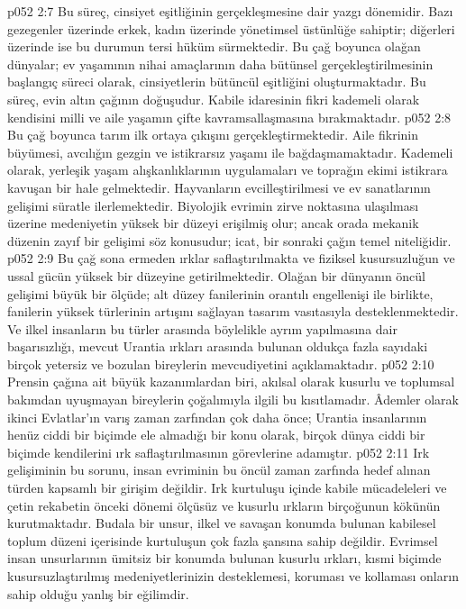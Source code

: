 \vs p052 2:7 Bu süreç, cinsiyet eşitliğinin gerçekleşmesine dair yazgı dönemidir. Bazı gezegenler üzerinde erkek, kadın üzerinde yönetimsel üstünlüğe sahiptir; diğerleri üzerinde ise bu durumun tersi hüküm sürmektedir. Bu çağ boyunca olağan dünyalar; ev yaşamının nihai amaçlarının daha bütünsel gerçekleştirilmesinin başlangıç süreci olarak, cinsiyetlerin bütüncül eşitliğini oluşturmaktadır. Bu süreç, evin altın çağının doğuşudur. Kabile idaresinin fikri kademeli olarak kendisini milli ve aile yaşamın çifte kavramsallaşmasına bırakmaktadır.
\vs p052 2:8 Bu çağ boyunca tarım ilk ortaya çıkışını gerçekleştirmektedir. Aile fikrinin büyümesi, avcılığın gezgin ve istikrarsız yaşamı ile bağdaşmamaktadır. Kademeli olarak, yerleşik yaşam alışkanlıklarının uygulamaları ve toprağın ekimi istikrara kavuşan bir hale gelmektedir. Hayvanların evcilleştirilmesi ve ev sanatlarının gelişimi süratle ilerlemektedir. Biyolojik evrimin zirve noktasına ulaşılması üzerine medeniyetin yüksek bir düzeyi erişilmiş olur; ancak orada mekanik düzenin zayıf bir gelişimi söz konusudur; icat, bir sonraki çağın temel niteliğidir.
\vs p052 2:9 Bu çağ sona ermeden ırklar saflaştırılmakta ve fiziksel kusursuzluğun ve ussal gücün yüksek bir düzeyine getirilmektedir. Olağan bir dünyanın öncül gelişimi büyük bir ölçüde; alt düzey fanilerinin orantılı engellenişi ile birlikte, fanilerin yüksek türlerinin artışını sağlayan tasarım vasıtasıyla desteklenmektedir. Ve ilkel insanların bu türler arasında böylelikle ayrım yapılmasına dair başarısızlığı, mevcut Urantia ırkları arasında bulunan oldukça fazla sayıdaki birçok yetersiz ve bozulan bireylerin mevcudiyetini açıklamaktadır.
\vs p052 2:10 Prensin çağına ait büyük kazanımlardan biri, akılsal olarak kusurlu ve toplumsal bakımdan uyuşmayan bireylerin çoğalımıyla ilgili bu kısıtlamadır. Âdemler olarak ikinci Evlatlar’ın varış zaman zarfından çok daha önce; Urantia insanlarının henüz ciddi bir biçimde ele almadığı bir konu olarak, birçok dünya ciddi bir biçimde kendilerini ırk saflaştırılmasının görevlerine adamıştır.
\vs p052 2:11 Irk gelişiminin bu sorunu, insan evriminin bu öncül zaman zarfında hedef alınan türden kapsamlı bir girişim değildir. Irk kurtuluşu içinde kabile mücadeleleri ve çetin rekabetin önceki dönemi ölçüsüz ve kusurlu ırkların birçoğunun kökünün kurutmaktadır. Budala bir unsur, ilkel ve savaşan konumda bulunan kabilesel toplum düzeni içerisinde kurtuluşun çok fazla şansına sahip değildir. Evrimsel insan unsurlarının ümitsiz bir konumda bulunan kusurlu ırkları, kısmi biçimde kusursuzlaştırılmış medeniyetlerinizin desteklemesi, koruması ve kollaması onların sahip olduğu yanlış bir eğilimdir.
